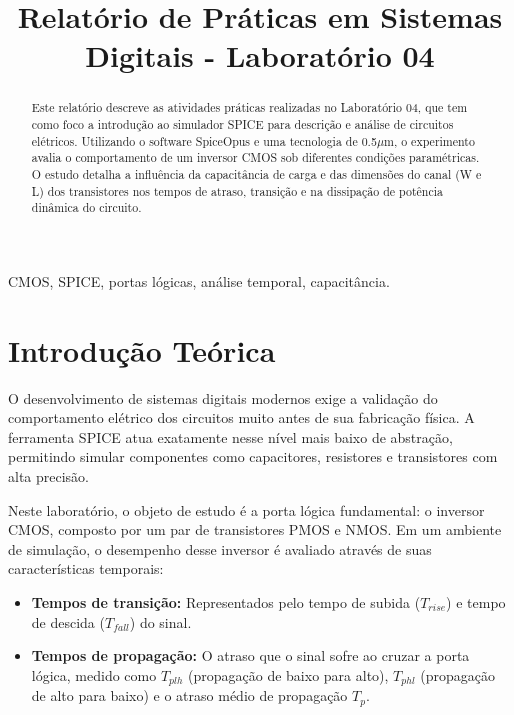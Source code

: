 \documentclass[conference]{IEEEtran}
\begin{document}
\title{Relatório de Práticas em Sistemas Digitais - Laboratório 04}

\author{
}

\maketitle

\begin{abstract}
Este relatório descreve as atividades práticas realizadas no Laboratório 04, que tem como foco a introdução ao simulador SPICE para descrição e análise de circuitos elétricos. Utilizando o software SpiceOpus e uma tecnologia de 0.5$\mu$m, o experimento avalia o comportamento de um inversor CMOS sob diferentes condições paramétricas. O estudo detalha a influência da capacitância de carga e das dimensões do canal (W e L) dos transistores nos tempos de atraso, transição e na dissipação de potência dinâmica do circuito.
\end{abstract}

\begin{IEEEkeywords}
CMOS, SPICE, portas lógicas, análise temporal, capacitância.
\end{IEEEkeywords}

\section{Introdução Teórica}
O desenvolvimento de sistemas digitais modernos exige a validação do comportamento elétrico dos circuitos muito antes de sua fabricação física. A ferramenta SPICE atua exatamente nesse nível mais baixo de abstração, permitindo simular componentes como capacitores, resistores e transistores com alta precisão. 

Neste laboratório, o objeto de estudo é a porta lógica fundamental: o inversor CMOS, composto por um par de transistores PMOS e NMOS. Em um ambiente de simulação, o desempenho desse inversor é avaliado através de suas características temporais:
\begin{itemize}
    \item \textbf{Tempos de transição:} Representados pelo tempo de subida ($T_{rise}$) e tempo de descida ($T_{fall}$) do sinal.
    \item \textbf{Tempos de propagação:} O atraso que o sinal sofre ao cruzar a porta lógica, medido como $T_{plh}$ (propagação de baixo para alto), $T_{phl}$ (propagação de alto para baixo) e o atraso médio de propagação $T_{p}$.
\end{itemize}
\end{document}
